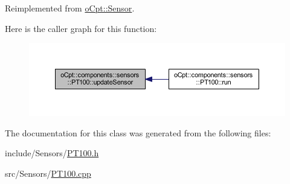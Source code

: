 Reimplemented from \hyperlink{classo_cpt_1_1_sensor_ab4b0dedb06f11bcf2368852035beb2b2}{o\+Cpt\+::\+Sensor}.



Here is the caller graph for this function\+:
\nopagebreak
\begin{figure}[H]
\begin{center}
\leavevmode
\includegraphics[width=350pt]{classo_cpt_1_1components_1_1sensors_1_1_p_t100_a66619675288a5344a55242d9bf097aee_icgraph}
\end{center}
\end{figure}




The documentation for this class was generated from the following files\+:\begin{DoxyCompactItemize}
\item 
include/\+Sensors/\hyperlink{_p_t100_8h}{P\+T100.\+h}\item 
src/\+Sensors/\hyperlink{_p_t100_8cpp}{P\+T100.\+cpp}\end{DoxyCompactItemize}
